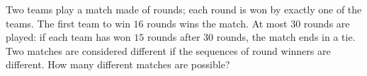 Two teams play a match made of rounds; each round is won by exactly one of the teams. The first team to win $16$ rounds wins the match. At most $30$ rounds are played: if each team has won $15$ rounds after $30$ rounds, the match ends in a tie. Two matches are considered different if the sequences of round winners are different. How many different matches are possible?
